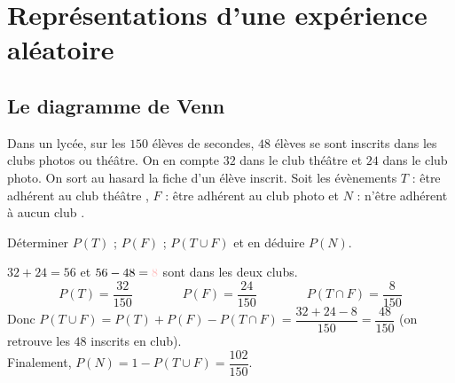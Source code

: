 \newpage

\section{Représentations d'une expérience aléatoire}
\subsection{Le diagramme de Venn}
\begin{Exemple}
Dans un lycée, sur les $150$ élèves de secondes, $48$ élèves se sont inscrits dans les clubs photos ou théâtre. On en compte $32$ dans le club théâtre et $24$ dans le club photo. On sort au hasard la fiche d'un élève inscrit. Soit les évènements $T$ : \og être adhérent au club théâtre \fg{}, $F$ : \og être adhérent au club photo \fg{} et $N$ : \og n'être adhérent à aucun club \fg{}.

\noindent Déterminer $P(T)$ ; $P(F)$ ;  $P(T\cup F)$ et en déduire $P(N)$.

\begin{minipage}[c]{0.6\linewidth}

 $32+24=56$  et $56-48=\color{pink}{8}$ sont dans les deux clubs.
$$P(T)=\dfrac{32}{150}
\qquad \qquad P(F)=\dfrac{24}{150} \qquad \qquad P(T\cap F)= \dfrac{8}{150}$$
Donc $P(T\cup F)=P(T)+P(F)- P(T\cap F)=\dfrac{32+24-8}{150} = \dfrac{48}{150}$ (on retrouve les $48$ inscrits en club).\\
Finalement, $P(N)=1-P(T\cup F)=\dfrac{102}{150}$.

\end{minipage} \hfill
\begin{minipage}[c]{0.4\linewidth}
\begin{center}  
\end{center}
\end{minipage}

\end{Exemple}
